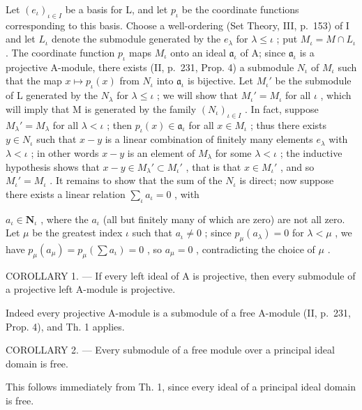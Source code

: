 Let \((e_{\iota})_{\iota \in I}\) be a basis for L, and let \(p_{\iota}\) be the coordinate functions corresponding to this basis. Choose a well-ordering (Set Theory, III, p.~153) of I and let \(L_{\iota}\) denote the submodule generated by the \(e_{\lambda}\) for \(\lambda \leqslant \iota\) ; put \(M_{\iota} = M \cap L_{\iota}\) . The coordinate function \(p_{\iota}\) maps \(M_{\iota}\) onto an ideal \(\mathfrak{a}_{\iota}\) of A; since \(\mathfrak{a}_{\iota}\) is a projective A-module, there exists (II, p.~231, Prop. 4) a submodule \(N_{\iota}\) of \(M_{\iota}\) such that the map \(x \mapsto p_{\iota}(x)\) from \(N_{\iota}\) into \(\mathfrak{a}_{\iota}\) is bijective. Let \(M_{\iota}'\) be the submodule of L generated by the \(N_{\lambda}\) for \(\lambda \leqslant \iota\) ; we will show that \(M_{\iota}' = M_{\iota}\) for all \(\iota\) , which will imply that M is generated by the family \((N_{\iota})_{\iota \in I}\) . In fact, suppose \(M_{\lambda}' = M_{\lambda}\) for all \(\lambda < \iota\) ; then \(p_{\iota}(x) \in \mathfrak{a}_{\iota}\) for all \(x \in M_{\iota}\) ; thus there exists \(y \in N_{\iota}\) such that \(x - y\) is a linear combination of finitely many elements \(e_{\lambda}\) with \(\lambda < \iota\) ; in other words \(x - y\) is an element of \(M_{\lambda}\) for some \(\lambda < \iota\) ; the inductive hypothesis shows that \(x - y \in M_{\lambda}' \subset M_{\iota}'\) , that is that \(x \in M_{\iota}'\) , and so \(M_{\iota}' = M_{\iota}\) . It remains to show that the sum of the \(N_{\iota}\) is direct; now suppose there exists a linear relation \(\sum_{\iota} a_{\iota} = 0\) , with

\(a_{\iota} \in \mathbf{N}_{\iota}\) , where the \(a_{\iota}\) (all but finitely many of which are zero) are not all zero. Let \(\mu\) be the greatest index \(\iota\) such that \(a_{\iota} \neq 0\) ; since \(p_{\mu}(a_{\lambda}) = 0\) for \(\lambda < \mu\) , we have \(p_{\mu}(a_{\mu}) = p_{\mu}\left(\sum a_{\iota}\right) = 0\) , so \(a_{\mu} = 0\) , contradicting the choice of \(\mu\) .

COROLLARY 1. --- If every left ideal of A is projective, then every submodule of a projective left A-module is projective.

Indeed every projective A-module is a submodule of a free A-module (II, p.~231, Prop. 4), and Th. 1 applies.

COROLLARY 2. --- Every submodule of a free module over a principal ideal domain is free.

This follows immediately from Th. 1, since every ideal of a principal ideal domain is free.

